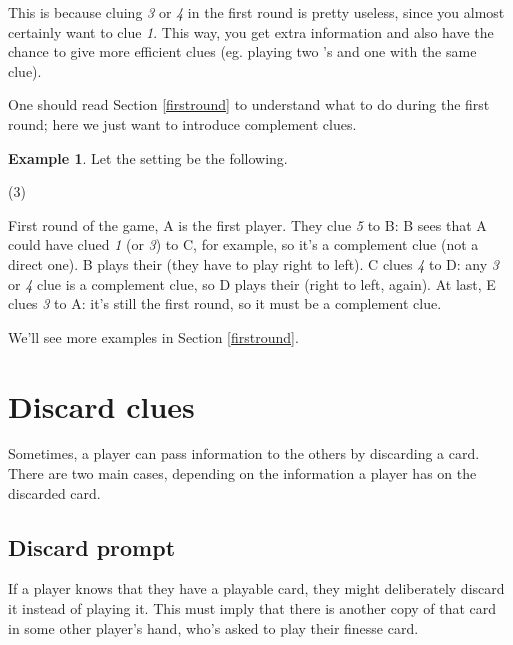 \documentclass[a4paper]{article}
\theoremstyle{plain}
\theoremstyle{definition}
\newtheorem{example}[theorem]{Example}
\begin{document}
This is because cluing \textit{3} or \textit{4} in the first round is pretty useless, since you almost certainly want to clue \textit{1}. This way, you get extra information and also have the chance to give more efficient clues (eg. playing two 's and one  with the same clue).

One should read Section \ref{firstround} to understand what to do during the first round; here we just want to introduce complement clues.

\begin{example}
	
	Let the setting be the following.
	
	\begin{tasks}(3)
		\task[+]      
		\task[A]    
		\task[B]    
		\task[C]    
		\task[D]    
		\task[E]    
	\end{tasks}
	
	First round of the game, A is the first player. They clue \textit{5} to B: B sees that A could have clued \textit{1} (or \textit{3}) to C, for example, so it's a complement clue (not a direct one). B plays their  (they have to play right to left). C clues \textit{4} to D: any \textit{3} or \textit{4} clue is a complement clue, so D plays their  (right to left, again). At last, E clues \textit{3} to A: it's still the first round, so it must be a complement clue.
\end{example}

We'll see more examples in Section \ref{firstround}.

\section{Discard clues}

Sometimes, a player can pass information to the others by discarding a card. There are two main cases, depending on the information a player has on the discarded card.

\subsection{Discard prompt}

If a player knows that they have a playable card, they might deliberately discard it instead of playing it. This must imply that there is another copy of that card in some other player's hand, who's asked to play their finesse card.
\end{document}
